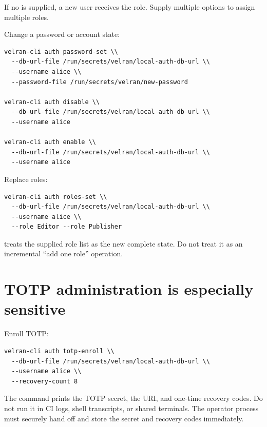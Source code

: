If no  is supplied, a new user receives the  role. Supply multiple  options to assign multiple roles.

Change a password or account state:

\begin{lstlisting}
velran-cli auth password-set \\
  --db-url-file /run/secrets/velran/local-auth-db-url \\
  --username alice \\
  --password-file /run/secrets/velran/new-password

velran-cli auth disable \\
  --db-url-file /run/secrets/velran/local-auth-db-url \\
  --username alice

velran-cli auth enable \\
  --db-url-file /run/secrets/velran/local-auth-db-url \\
  --username alice
\end{lstlisting}

Replace roles:

\begin{lstlisting}
velran-cli auth roles-set \\
  --db-url-file /run/secrets/velran/local-auth-db-url \\
  --username alice \\
  --role Editor --role Publisher
\end{lstlisting}

 treats the supplied role list as the new complete state. Do not treat it as an incremental ``add one role'' operation.

\section{TOTP administration is especially sensitive}

Enroll TOTP:

\begin{lstlisting}
velran-cli auth totp-enroll \\
  --db-url-file /run/secrets/velran/local-auth-db-url \\
  --username alice \\
  --recovery-count 8
\end{lstlisting}

The command prints the TOTP secret, the  URI, and one-time recovery codes. Do not run it in CI logs, shell transcripts, or shared terminals. The operator process must securely hand off and store the secret and recovery codes immediately.

